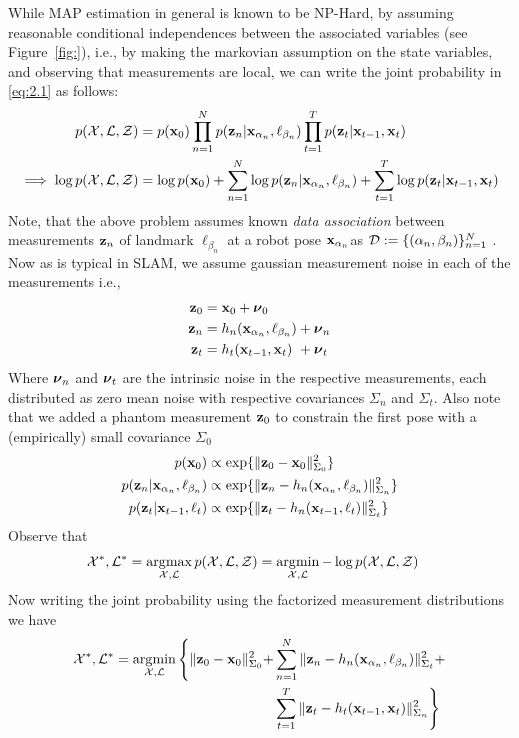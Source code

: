 While MAP estimation in general is known to be NP-Hard, by assuming reasonable conditional independences between the associated variables (see Figure~\ref{fig:}), i.e., by making the markovian assumption on the state variables, and observing that measurements are local, we can write the joint probability in \ref{eq:2.1} as follows:
\begin{align}
    p(\mathcal{X}, \mathcal{L}, \mathcal{Z}) &= p(\mathbf{x}_0) \prod_{n=1}^{N} p(\mathbf{z}_n | \mathbf{x}_{\alpha_n}, \ell_{\beta_n}) \prod_{t=1}^{T} p(\mathbf{z}_t | \mathbf{x}_{t-1}, \mathbf{x}_{t})\nonumber\\
    \implies \log p(\mathcal{X}, \mathcal{L}, \mathcal{Z}) &= \log p(\mathbf{x}_0) + \sum_{n=1}^{N} \log p(\mathbf{z}_n | \mathbf{x}_{\alpha_n}, \ell_{\beta_n}) + \sum_{t=1}^{T} \log p(\mathbf{z}_t | \mathbf{x}_{t-1}, \mathbf{x}_{t})
\end{align}
Note, that the above problem assumes known \emph{data association} between measurements $\mathbf{z}_n$ of landmark $\ell_{\beta_n}$ at a robot pose $\mathbf{x}_{\alpha_n}$as $\mathcal{D} := \{(\alpha_n, \beta_n)\}_{n=1}^{N}$ \cite{bowmanProbabilisticDataAssociation2017}.
Now as is typical in SLAM, we assume gaussian measurement noise in each of the measurements i.e.,
\begin{align*}
    \mathbf{z}_0 &= \mathbf{x}_0 + \boldsymbol \nu_0\\
    \mathbf{z}_n &= h_n(\mathbf{x}_{\alpha_n}, \ell_{\beta_n}) + \boldsymbol \nu_n\\
    \mathbf{z}_t &= h_t(\mathbf{x}_{t-1}, \mathbf{x}_t) ~+ \boldsymbol \nu_t
\end{align*}
Where $\boldsymbol \nu_n$ and $\boldsymbol \nu_t$ are the intrinsic noise in the respective measurements, each distributed as zero mean noise with respective covariances $\Sigma_n$ and $\Sigma_t$. Also note that we added a phantom measurement $\mathbf{z}_0$ to constrain the first pose with a (empirically) small covariance $\Sigma_0$
\begin{align*}
    p(\mathbf{x}_0) &\propto \exp\{ \|\mathbf{z}_0 - \mathbf{x}_0\|^2_{\Sigma_0}\}\\
    p(\mathbf{z}_n | \mathbf{x}_{\alpha_n}, \ell_{\beta_n}) &\propto \exp\{ \|\mathbf{z}_n - h_n(\mathbf{x}_{\alpha_n}, \ell_{\beta_n})\|^2_{\Sigma_n}\}\\
    p(\mathbf{z}_t | \mathbf{x}_{t-1}, \ell_{t}) &\propto \exp\{ \|\mathbf{z}_t - h_n(\mathbf{x}_{t-1}, \ell_{t})\|^2_{\Sigma_t}\}
\end{align*}
Observe that
\begin{align*}
    \mathcal{X}^*, \mathcal{L}^* &= \operatorname*{\arg\!\max}_{\mathcal{X}, \mathcal{L}} p(\mathcal{X}, \mathcal{L}, \mathcal{Z}) = \operatorname*{\arg\!\min}_{\mathcal{X}, \mathcal{L}} - \log p(\mathcal{X}, \mathcal{L}, \mathcal{Z})
\end{align*}
Now writing the joint probability using the factorized measurement distributions we have
\begin{align*}
    \mathcal{X}^*, \mathcal{L}^* = \operatorname*{\arg\!\min}_{\mathcal{X}, \mathcal{L}} \Bigg \{ \| \mathbf{z}_0 - \mathbf{x}_0 \|_{\Sigma_0}^2 + &\sum_{n=1}^{N} \| \mathbf{z}_n - h_n(\mathbf{x}_{\alpha_n}, \ell_{\beta_n}) \|_{\Sigma_t}^2 + \\&\sum_{t=1}^{T}\| \mathbf{z}_t - h_t(\mathbf{x}_{t-1}, \mathbf{x}_{t}) \|_{\Sigma_n}^2 \Bigg \}
\end{align*}
